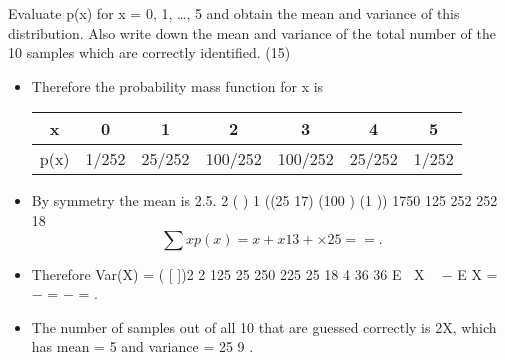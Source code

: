 \documentclass[a4paper,12pt]{article}
\begin{document}
\begin{enumerate}
\begin{framed}

Evaluate p(x) for x = 0, 1, …, 5 and obtain the mean and variance of this
distribution. Also write down the mean and variance of the total number
of the 10 samples which are correctly identified.
(15)
\end{framed}
\begin{itemize}
    \item Therefore the
probability mass function for x is
\begin{center}
\begin{tabular}{|c|c|c|c|c|c|c|}
\hline 
x & 0 & 1& 2& 3& 4& 5\\ \hline
p(x)& 1/252& 25/252& 100/252 &100/252& 25/252 & 1/252\\ \hline 
\end{tabular}
\end{center}

\item By symmetry the mean is 2.5.
2 ( ) 1 ((25 17) (100 ) (1 )) 1750 125
252 252 18
\[ \sum x p(x) = x + x13 + × 25 = = .\]
\item Therefore Var(X) = ( [ ])2 2 125 25 250 225 25
18 4 36 36
E X  − E X = − = − = .
\item The number of samples out of all 10 that are guessed correctly is 2X, which has mean
= 5 and variance = 25
9
.
\end{itemize}

\end{enumerate}
\end{document}
